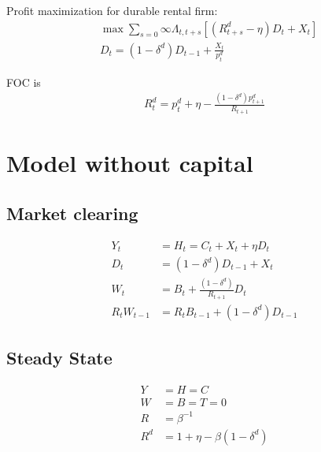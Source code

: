 \documentclass[11pt]{article}
\begin{document}
Profit maximization for durable rental firm:
\begin{align*}
    &\max \sum_{s=0}{\infty}\Lambda_{t,t+s}[(R_{t+s}^d - \eta) D_t + X_t] \\
    &D_t = (1-\delta^d) D_{t-1}+ \frac{X_t}{p_t^d}
\end{align*}

FOC is
\begin{align*}
    R_{t}^d = p_t^d + \eta - \frac{(1-\delta^d)p_{t+1}^d}{R_{t+1}}
\end{align*}

\section{Model without capital}

\subsection{Market clearing}
\begin{align*}
    Y_t &= H_t = C_t + X_t + \eta D_t \\
    D_t &= (1 - \delta^d) D_{t-1} + X_t \\
    W_t &= B_t + \frac{(1 - \delta^d)}{R_{t+1}}D_t \\
    R_{t} W_{t-1} &= R_{t}B_{t-1} + (1 - \delta^d) D_{t-1}
\end{align*}

\subsection{Steady State}
\begin{align*}
    Y &= H = C \\
    W &= B = T = 0 \\
    R &= \beta^{-1} \\
    R^d &= 1 + \eta - \beta(1-\delta^d) \\
\end{align*}
\end{document}
